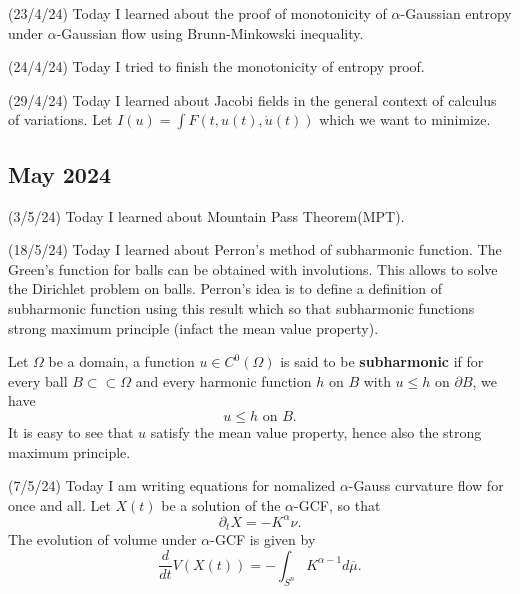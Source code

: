 \documentclass[12pt,a4paper]{article}
\begin{document}
(23/4/24) Today I learned about the proof of monotonicity of $ \alpha $-Gaussian entropy under $ \alpha $-Gaussian flow using Brunn-Minkowski inequality.

(24/4/24) Today I tried to finish the monotonicity of entropy proof.

(29/4/24) Today I learned about Jacobi fields in the general context of calculus of variations. Let $ I (u) = \int F(t, u(t),\dot{u}(t)) $ which we want to minimize. 

\subsection*{May 2024}

\quad(3/5/24) Today I learned about Mountain Pass Theorem(MPT). 

(18/5/24) Today I learned about Perron's method of subharmonic function. The Green's function for balls can be obtained with involutions. This allows to solve the Dirichlet problem on balls. Perron's idea is to define a definition of subharmonic function using this result which so that subharmonic functions strong maximum principle (infact the mean value property). 

Let $ \Omega $ be a domain, a function $ u \in C^{0}(\Omega) $ is said to be \textbf{subharmonic} if for every ball $ B \subset \subset \Omega $ and every harmonic function $ h $ on $ B $ with $ u \le h $ on $ \partial B $, we have 
\[ u \le h \text{ on } B. \]
It is easy to see that $ u $ satisfy the mean value property, hence also the strong maximum principle. 

(7/5/24) Today I am writing equations for nomalized $ \alpha $-Gauss curvature flow for once and all. Let $ X(t) $ be a solution of the $ \alpha $-GCF, so that 
\[ \partial_{t}X = - K^{\alpha}\nu.\]
The evolution of volume under $ \alpha $-GCF is given by 
\[  \frac{d}{dt}V(X(t)) = - \int_{S^{n}}K^{\alpha-1}d \overline{\mu}. \]
\end{document}
